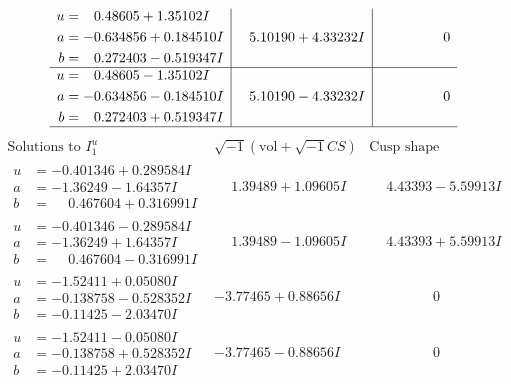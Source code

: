 \documentclass[1p]{elsarticle_modified}
\theoremstyle{definition}
\newcommand{\I}{\sqrt{-1}}
\begin{document}
$$\begin{array}{c|c|c}
\begin{aligned}
u &= \phantom{-}0.48605 + 1.35102 I \\
a &= -0.634856 + 0.184510 I \\
b &= \phantom{-}0.272403 - 0.519347 I\end{aligned}
 & \phantom{-}5.10190 + 4.33232 I & \phantom{-0.000000 } 0 \\ \hline\begin{aligned}
u &= \phantom{-}0.48605 - 1.35102 I \\
a &= -0.634856 - 0.184510 I \\
b &= \phantom{-}0.272403 + 0.519347 I\end{aligned}
 & \phantom{-}5.10190 - 4.33232 I & \phantom{-0.000000 } 0\\
 \hline 
 \end{array}$$\newpage$$\begin{array}{c|c|c}  
\text{Solutions to }I^u_{1}& \I (\text{vol} + \sqrt{-1}CS) & \text{Cusp shape}\\
 \hline 
\begin{aligned}
u &= -0.401346 + 0.289584 I \\
a &= -1.36249 - 1.64357 I \\
b &= \phantom{-}0.467604 + 0.316991 I\end{aligned}
 & \phantom{-}1.39489 + 1.09605 I & \phantom{-}4.43393 - 5.59913 I \\ \hline\begin{aligned}
u &= -0.401346 - 0.289584 I \\
a &= -1.36249 + 1.64357 I \\
b &= \phantom{-}0.467604 - 0.316991 I\end{aligned}
 & \phantom{-}1.39489 - 1.09605 I & \phantom{-}4.43393 + 5.59913 I \\ \hline\begin{aligned}
u &= -1.52411 + 0.05080 I \\
a &= -0.138758 - 0.528352 I \\
b &= -0.11425 - 2.03470 I\end{aligned}
 & -3.77465 + 0.88656 I & \phantom{-0.000000 } 0 \\ \hline\begin{aligned}
u &= -1.52411 - 0.05080 I \\
a &= -0.138758 + 0.528352 I \\
b &= -0.11425 + 2.03470 I\end{aligned}
 & -3.77465 - 0.88656 I & \phantom{-0.000000 } 0 \\ \hline\begin{aligned}

\end{aligned}
\end{array}$$
\end{document}
